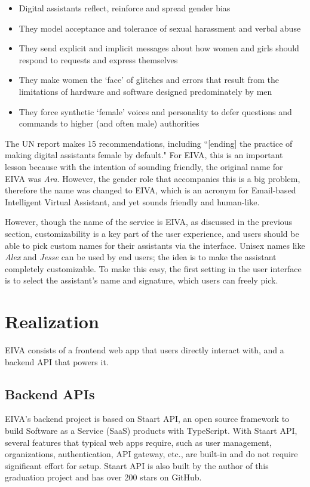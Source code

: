 \documentclass{article}
\begin{document}
\begin{itemize}
	\item Digital assistants reflect, reinforce and spread gender bias
	\item They model acceptance and tolerance of sexual harassment and verbal abuse
	\item They send explicit and implicit messages about how women and girls should respond to requests and express themselves
	\item They make women the ‘face’ of glitches and errors that result from the limitations of hardware and software designed predominately by men
	\item They force synthetic ‘female’ voices and personality to defer questions and commands to higher (and often male) authorities
\end{itemize}

The UN report makes 15 recommendations, including ``[ending] the practice of making digital assistants female by default." For EIVA, this is an important lesson because with the intention of sounding friendly, the original name for EIVA was \emph{Ara}. However, the gender role that accompanies this is a big problem, therefore the name was changed to EIVA, which is an acronym for Email-based Intelligent Virtual Assistant, and yet sounds friendly and human-like.

However, though the name of the service is EIVA, as discussed in the previous section, customizability is a key part of the user experience, and users should be able to pick custom names for their assistants via the interface. Unisex names like \emph{Alex} and \emph{Jesse} can be used by end users; the idea is to make the assistant completely customizable. To make this easy, the first setting in the user interface is to select the assistant's name and signature, which users can freely pick.

\newpage

\section{Realization}

EIVA consists of a frontend web app that users directly interact with, and a backend API that powers it.

\subsection{Backend APIs}

EIVA's backend project is based on Staart API, an open source framework to build Software as a Service (SaaS) products with TypeScript. With Staart API, several features that typical web apps require, such as user management, organizations, authentication, API gateway, etc., are built-in and do not require significant effort for setup. Staart API is also built by the author of this graduation project and has over 200 stars on GitHub.
\end{document}
